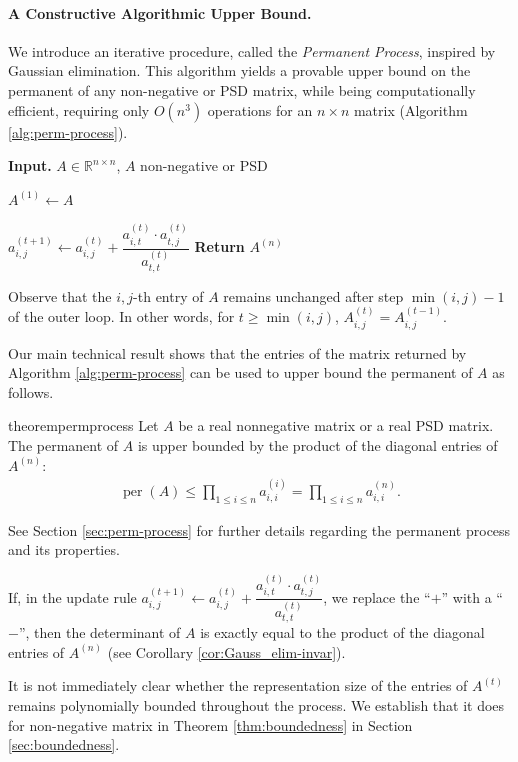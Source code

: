 \documentclass[11pt]{article}
\theoremstyle{definition}
\DeclareMathOperator{\per}{per}
\begin{document}
\paragraph{A Constructive Algorithmic Upper Bound.} We introduce an iterative procedure, called the \emph{Permanent Process}, inspired by Gaussian elimination. This algorithm yields a provable upper bound on the permanent of any non-negative or PSD matrix, while being computationally efficient, requiring only $O(n^3)$ operations for an $n\times n$ matrix (Algorithm \ref{alg:perm-process}).
\begin{algorithm}[H]
\caption{The Permanent Process}\label{alg:perm-process}
\begin{algorithmic}
\State \textbf{Input.} $A \in \mathbb{R}^{n \times n}$, $A$ non-negative or PSD

\State $A^{(1)} \gets A$

            \State $a_{i,j}^{(t+1)} \gets a_{i,j}^{(t)} + \dfrac{a_{i,t}^{(t)} \cdot a_{t,j}^{(t)}}{a_{t,t}^{(t)}}$
        \EndFor
    \EndFor
\EndFor
\State \textbf{Return} $A^{(n)}$
\end{algorithmic}
\end{algorithm}
Observe that the $i,j$-th entry of $A$ remains unchanged after step $\min(i,j)-1$ of the outer loop. In other words, for $t \geq \min(i,j)$, $A^{(t)}_{i,j} = A^{(t-1)}_{i,j}$. 

Our main technical result shows that the entries of the matrix returned by Algorithm \ref{alg:perm-process} can be used to upper bound the permanent of $A$ as follows.

    \begin{restatable}{theorem}{permprocess} \label{thm:perm-process-invar}
    Let $A$ be a real nonnegative matrix or a real PSD matrix.
    The permanent of $A$ is upper bounded by the product of the diagonal entries of $A^{(n)}$:
	\begin{align*}
		\per(A) \leq \prod_{1\leq i\leq n}a_{i,i}^{(i)} = \prod_{1\leq i\leq n}a_{i,i}^{(n)}.
	\end{align*}
    \end{restatable}

See Section \ref{sec:perm-process} for further details regarding the permanent process and its properties.
\begin{remark}
If, in the update rule $a_{i,j}^{(t+1)} \leftarrow a_{i,j}^{(t)} + \dfrac{a_{i,t}^{(t)} \cdot a_{t,j}^{(t)}}{a_{t,t}^{(t)}}$, we replace the ``$+$'' with a ``$-$'', then the determinant of $A$ is exactly equal to the product of the diagonal entries of $A^{(n)}$ (see Corollary \ref{cor:Gauss_elim-invar}).
\end{remark}
\begin{remark}
It is not immediately clear whether the representation size of the entries of $A^{(t)}$ remains polynomially bounded throughout the process. We establish that it does for non-negative matrix in Theorem \ref{thm:boundedness} in Section \ref{sec:boundedness}.
\end{remark}
\end{document}
